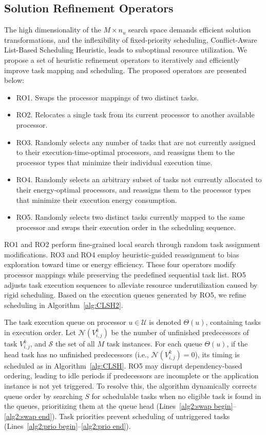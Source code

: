 \documentclass{IEEEtaes}
\begin{document}
\subsection{Solution Refinement Operators}
The high dimensionality of the $M\times n_u$ search space demands efficient solution transformations, and the inflexibility of fixed-priority scheduling, Conflict-Aware List-Based Scheduling Heuristic, leads to suboptimal resource utilization. We propose a set of heuristic refinement operators to iteratively and efficiently improve task mapping and scheduling. The proposed operators are presented below:
\begin{itemize}
    \item{RO1. Swaps the processor mappings of two distinct tasks.}
    \item{RO2. Relocates a single task from its current processor to another available processor.}
    \item{RO3. Randomly selects any number of tasks that are not currently assigned to their execution-time-optimal processors, and reassigns them to the processor types that minimize their individual execution time.}
    \item{RO4. Randomly selects an arbitrary subset of tasks not currently allocated to their energy-optimal processors, and reassigns them to the processor types that minimize their execution energy consumption.}
    \item{RO5. Randomly selects two distinct tasks currently mapped to the same processor and swaps their execution order in the scheduling sequence.}
\end{itemize}

RO1 and RO2 perform fine-grained local search through random task assignment modifications. RO3 and RO4 employ heuristic-guided reassignment to bias exploration toward time or energy efficiency. These four operators modify processor mappings while preserving the predefined sequential task list. RO5 adjusts task execution sequences to alleviate resource underutilization caused by rigid scheduling. Based on the execution queues generated by RO5, we refine scheduling in Algorithm~\ref{alg:CLSH2}.

The task execution queue on processor $u \in \mathcal{U}$ is denoted $\Theta(u)$, containing tasks in execution order. Let $\mathcal{N}(V_{i,j}^{k})$ be the number of unfinished predecessors of task $V_{i,j}^{k}$, and $\mathcal{S}$ the set of all $M$ task instances. For each queue $\Theta(u)$, if the head task has no unfinished predecessors (i.e., $\mathcal{N}(V_{i,j}^{k})=0$), its timing is scheduled as in Algorithm~\ref{alg:CLSH}. RO5 may disrupt dependency-based ordering, leading to idle periods if predecessors are incomplete or the application instance is not yet triggered. To resolve this, the algorithm dynamically corrects queue order by searching $S$ for schedulable tasks when no eligible task is found in the queues, prioritizing them at the queue head (Lines~\ref{alg2:swap begin}–\ref{alg2:swap end}). Task priorities prevent scheduling of untriggered tasks (Lines~\ref{alg2:prio begin}–\ref{alg2:prio end}).
\end{document}
